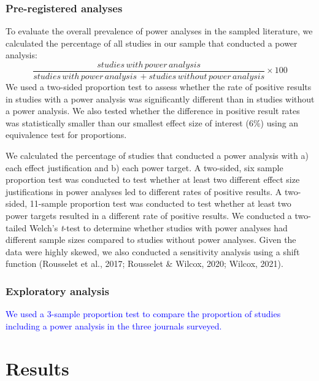 \documentclass[
  man, donotrepeattitle,mask,floatsintext]{apa7}
\begin{document}
\hypertarget{pre-registered-analyses}{%
\subsubsection{Pre-registered analyses}\label{pre-registered-analyses}}

To evaluate the overall prevalence of power analyses in the sampled literature, we calculated the percentage of all studies in our sample that conducted a power analysis:
\[\frac{studies\, with\, power\, analysis}{studies\, with\, power\, analysis\, + studies\, without\, power\, analysis} \times 100\]
We used a two-sided proportion test to assess whether the rate of positive results in studies with a power analysis was significantly different than in studies without a power analysis. We also tested whether the difference in positive result rates was statistically smaller than our smallest effect size of interest (6\%) using an equivalence test for proportions.

We calculated the percentage of studies that conducted a power analysis with a) each effect justification and b) each power target. A two-sided, six sample proportion test was conducted to test whether at least two different effect size justifications in power analyses led to different rates of positive results. A two-sided, 11-sample proportion test was conducted to test whether at least two power targets resulted in a different rate of positive results. We conducted a two-tailed Welch's \emph{t}-test to determine whether studies with power analyses had different sample sizes compared to studies without power analyses. Given the data were highly skewed, we also conducted a sensitivity analysis using a shift function (Rousselet et al., 2017; Rousselet \& Wilcox, 2020; Wilcox, 2021).

\hypertarget{exploratory-analysis}{%
\subsubsection{Exploratory analysis}\label{exploratory-analysis}}

\textcolor{blue}{We used a 3-sample proportion test to compare the proportion of studies including a power analysis in the three journals surveyed.}

\hypertarget{results}{%
\section{Results}\label{results}}
\end{document}
